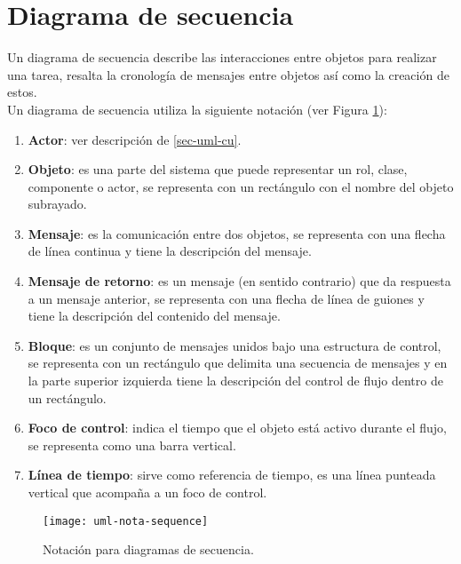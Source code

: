 \section{Diagrama de secuencia}\label{sec-uml-seq}
Un diagrama de secuencia describe las interacciones entre objetos para realizar una tarea, resalta la cronología de mensajes entre objetos así como la creación de estos\cite{UMLClassroom, SoftwareEngineeringUML}.\\
Un diagrama de secuencia utiliza la siguiente notación\cite{UMLClassroom, SoftwareEngineeringUML} (ver Figura \ref{fig:uml-nota-sequence}):
\begin{enumerate}
  \item \textbf{Actor}: ver descripción de \ref{sec-uml-cu}.
  \item \textbf{Objeto}: es una parte del sistema que puede representar un rol, clase, componente o actor, se representa con un rectángulo con el nombre del objeto subrayado.
  \item \textbf{Mensaje}: es la comunicación entre dos objetos, se representa con una flecha de línea continua y tiene la descripción del mensaje.
  \item \textbf{Mensaje de retorno}: es un mensaje (en sentido contrario) que da respuesta a un mensaje anterior, se representa con una flecha de línea de guiones y tiene la descripción del contenido del mensaje.
  \item \textbf{Bloque}: es un conjunto de mensajes unidos bajo una estructura de control, se representa con un rectángulo que delimita una secuencia de mensajes y en la parte superior izquierda tiene la descripción del control de flujo dentro de un rectángulo.
  \item \textbf{Foco de control}: indica el tiempo que el objeto está activo durante el flujo, se representa como una barra vertical.
  \item \textbf{Línea de tiempo}: sirve como referencia de tiempo, es una línea punteada vertical que acompaña a un foco de control.
\end{enumerate}

\begin{figure}[h]
  \centering
  \texttt{[image: uml-nota-sequence]}
  \caption{Notación para diagramas de secuencia\cite{SoftwareEngineeringUML}.}
  \label{fig:uml-nota-sequence}
\end{figure}


